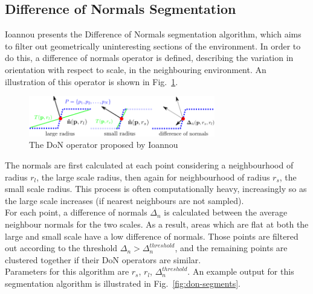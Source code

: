 \subsection{Difference of Normals Segmentation}
\label{subsec:DoN}

Ioannou \cite{ioannou2012difference} presents the Difference of Normals segmentation algorithm, which aims to filter out geometrically uninteresting sections of the environment.  
In order to do this, a difference of normals operator is defined, describing the variation in orientation with respect to scale, in the neighbouring environment. An illustration of this operator is shown in Fig.~\ref{fig:DoN}.\\

\begin{figure}
  \centering
  \includegraphics[width=3.2in]{images/DoN.png}
  \caption{The DoN operator proposed by Ioannou \cite{ioannou2012difference}}
  \label{fig:DoN}
\end{figure}

The normals are first calculated at each point considering a neighbourhood of radius $r_l$, the large scale radius, then again for neighbourhood of radius $r_s$, the small scale radius. This process is often computationally heavy, increasingly so as the large scale increases (if nearest neighbours are not sampled).\\

For each point, a difference of normals $\Delta_n$ is calculated between the average neighbour normals for the two scales. As a result, areas which are flat at both the large and small scale have a low difference of normals. Those points are filtered out according to the threshold $\Delta_n > \Delta_n^{threshold}$, and the remaining points are clustered together if their DoN operators are similar.\\

Parameters for this algorithm are $r_s$, $r_l$, $\Delta_n^{threshold}$. An example output for this segmentation algorithm is illustrated in Fig.~\ref{fig:don-segments}.\\

